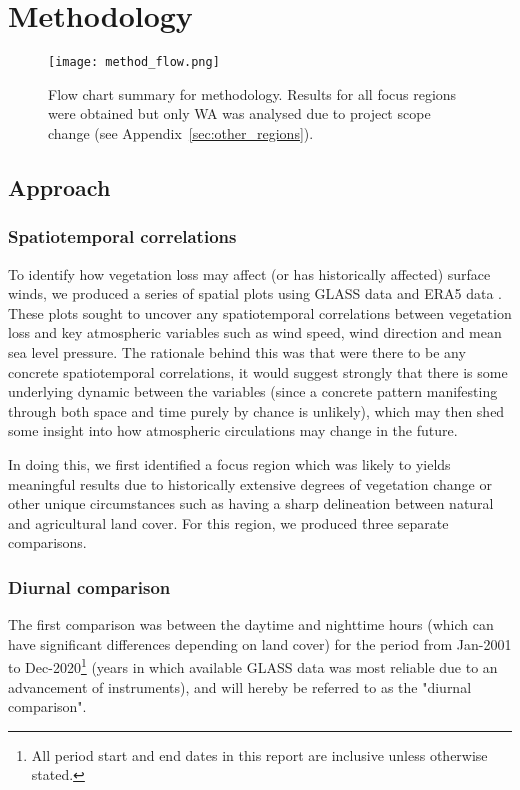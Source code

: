 \chapter{Methodology}
\label{ch:method}

\begin{figure}[!ht]
	\centering
	\texttt{[image: method\_flow.png]}
	\caption[Methodology Flow Chart]{Flow chart summary for methodology. Results for all focus regions were obtained but only \acl{WA} was analysed due to project scope change (see Appendix~\ref{sec:other_regions}).}
	\label{fig:method_flow}
\end{figure}

\section{Approach}

\subsection{Spatiotemporal correlations}

To identify how vegetation loss may affect (or has historically affected) surface winds, we produced a series of spatial plots using \ac{GLASS} data \citep{liang2021} and \ac{ERA5} data \citep{era5}. These plots sought to uncover any spatiotemporal correlations between vegetation loss and key atmospheric variables such as wind speed, wind direction and mean sea level pressure. The rationale behind this was that were there to be any concrete spatiotemporal correlations, it would suggest strongly that there is some underlying dynamic between the variables (since a concrete pattern manifesting through both space and time purely by chance is unlikely), which may then shed some insight into how atmospheric circulations may change in the future.

In doing this, we first identified a focus region which was likely to yields meaningful results due to historically extensive degrees of vegetation change or other unique circumstances such as having a sharp delineation between natural and agricultural land cover. For this region, we produced three separate comparisons. 

\subsection{Diurnal comparison}

The first comparison was between the daytime and nighttime hours (which can have significant differences depending on land cover) for the period from Jan-2001 to Dec-2020\footnote{All period start and end dates in this report are inclusive unless otherwise stated.} (years in which available \ac{GLASS} data was most reliable due to an advancement of instruments), and will hereby be referred to as the "diurnal comparison".

